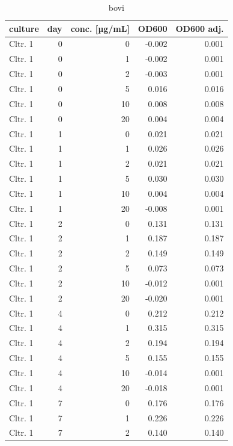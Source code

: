 \begin{longtable}{lrrrr}
\caption{bovi} \\ 
  \toprule
culture & day & conc. [µg/mL] & OD600 & OD600 adj. \\ 
  \midrule
Cltr. 1 &    0 &    0 & -0.002 & 0.001 \\ 
  Cltr. 1 &    0 &    1 & -0.002 & 0.001 \\ 
  Cltr. 1 &    0 &    2 & -0.003 & 0.001 \\ 
  Cltr. 1 &    0 &    5 & 0.016 & 0.016 \\ 
  Cltr. 1 &    0 &   10 & 0.008 & 0.008 \\ 
  Cltr. 1 &    0 &   20 & 0.004 & 0.004 \\ 
  Cltr. 1 &    1 &    0 & 0.021 & 0.021 \\ 
  Cltr. 1 &    1 &    1 & 0.026 & 0.026 \\ 
  Cltr. 1 &    1 &    2 & 0.021 & 0.021 \\ 
  Cltr. 1 &    1 &    5 & 0.030 & 0.030 \\ 
  Cltr. 1 &    1 &   10 & 0.004 & 0.004 \\ 
  Cltr. 1 &    1 &   20 & -0.008 & 0.001 \\ 
  Cltr. 1 &    2 &    0 & 0.131 & 0.131 \\ 
  Cltr. 1 &    2 &    1 & 0.187 & 0.187 \\ 
  Cltr. 1 &    2 &    2 & 0.149 & 0.149 \\ 
  Cltr. 1 &    2 &    5 & 0.073 & 0.073 \\ 
  Cltr. 1 &    2 &   10 & -0.012 & 0.001 \\ 
  Cltr. 1 &    2 &   20 & -0.020 & 0.001 \\ 
  Cltr. 1 &    4 &    0 & 0.212 & 0.212 \\ 
  Cltr. 1 &    4 &    1 & 0.315 & 0.315 \\ 
  Cltr. 1 &    4 &    2 & 0.194 & 0.194 \\ 
  Cltr. 1 &    4 &    5 & 0.155 & 0.155 \\ 
  Cltr. 1 &    4 &   10 & -0.014 & 0.001 \\ 
  Cltr. 1 &    4 &   20 & -0.018 & 0.001 \\ 
  Cltr. 1 &    7 &    0 & 0.176 & 0.176 \\ 
  Cltr. 1 &    7 &    1 & 0.226 & 0.226 \\ 
  Cltr. 1 &    7 &    2 & 0.140 & 0.140 \\ 

\end{longtable}
